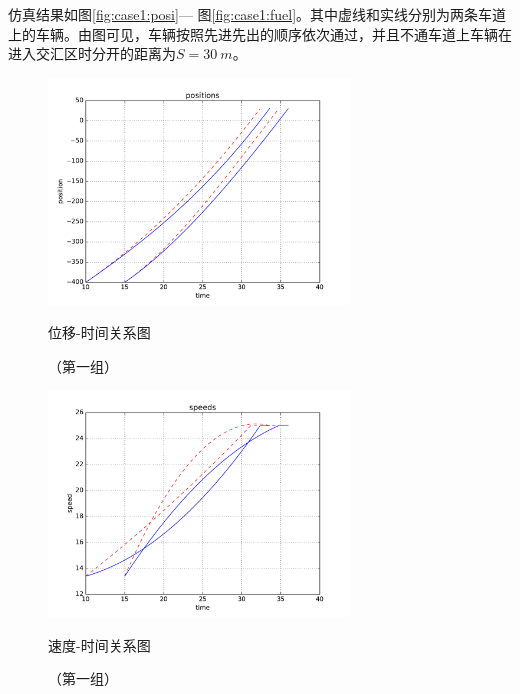 仿真结果如图\ref{fig:case1:posi}--- 图\ref{fig:case1:fuel}。其中虚线和实线分别为两条车道上的车辆。由图可见，车辆按照先进先出的顺序依次通过，并且不通车道上车辆在进入交汇区时分开的距离为$S=\SI{30}{m}$。
\begin{figure}[htbp]
\begin{minipage}{0.48\textwidth}
  \centering
  \includegraphics[height=6cm]{figures/sim_case1/posi.pdf}
  \caption{位移-时间关系图}
  \caption*{\small （第一组）}
  \label{fig:case1:posi}
\end{minipage}\hfill
\begin{minipage}{0.48\textwidth}
  \centering
  \includegraphics[height=6cm]{figures/sim_case1/speed.pdf}
  \caption{速度-时间关系图}
  \caption*{\small （第一组）}
  \label{fig:case1:speed}
\end{minipage}
\end{figure}
